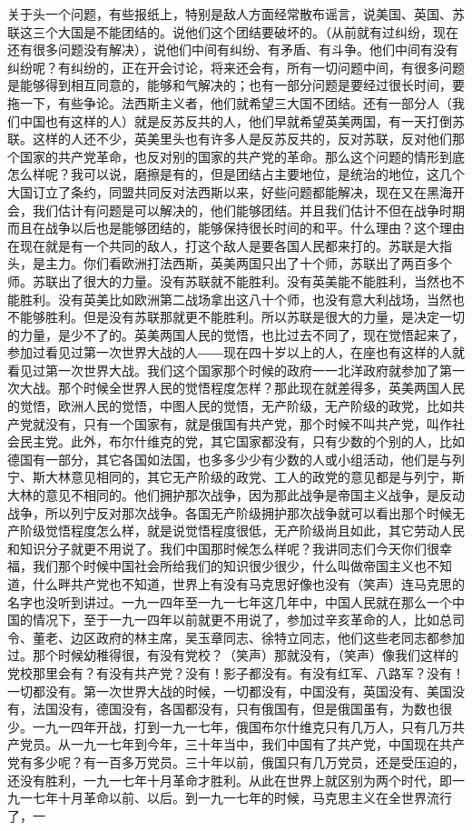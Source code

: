 关于头一个问题，有些报纸上，特别是敌人方面经常散布谣言，说美国、英国、苏联这三个大国是不能团结的。说他们这个团结要破坏的。（从前就有过纠纷，现在还有很多问题没有解决），说他们中间有纠纷、有矛盾、有斗争。他们中间有没有纠纷呢？有纠纷的，正在开会讨论，将来还会有，所有一切问题中间，有很多问题是能够得到相互同意的，能够和气解决的；也有一部分问题是要经过很长时间，要拖一下，有些争论。法西斯主义者，他们就希望三大国不团结。还有一部分人（我们中国也有这样的人）就是反苏反共的人，他们早就希望英美两国，有一天打倒苏联。这样的人还不少，英美里头也有许多人是反苏反共的，反对苏联，反对他们那个国家的共产党革命，也反对别的国家的共产党的革命。那么这个问题的情形到底怎么样呢？我可以说，磨擦是有的，但是团结占主要地位，是统治的地位，这几个大国订立了条约，同盟共同反对法西斯以来，好些问题都能解决，现在又在黑海开会，我们估计有问题是可以解决的，他们能够团结。并且我们估计不但在战争时期而且在战争以后也是能够团结的，能够保持很长时间的和平。什么理由？这个理由在现在就是有一个共同的敌人，打这个敌人是要各国人民都来打的。苏联是大指头，是主力。你们看欧洲打法西斯，英美两国只出了十个师，苏联出了两百多个师。苏联出了很大的力量。没有苏联就不能胜利。没有英美能不能胜利，当然也不能胜利。没有英美比如欧洲第二战场拿出这八十个师，也没有意大利战场，当然也不能够胜利。但是没有苏联那就更不能胜利。所以苏联是很大的力量，是决定一切的力量，是少不了的。英美两国人民的觉悟，也比过去不同了，现在觉悟起来了，参加过看见过第一次世界大战的人――现在四十岁以上的人，在座也有这样的人就看见过第一次世界大战。我们这个国家那个时候的政府一一北洋政府就参加了第一次大战。那个时候全世界人民的觉悟程度怎样？那此现在就差得多，英美两国人民的觉悟，欧洲人民的觉悟，中图人民的觉悟，无产阶级，无产阶级的政党，比如共产党就没有，只有一个国家有，就是俄国有共产党，那个时候不叫共产党，叫作社会民主党。此外，布尔什维克的党，其它国家都没有，只有少数的个别的人，比如德国有一部分，其它各国如法国，也多多少少有少数的人或小组活动，他们是与列宁、斯大林意见相同的，其它无产阶级的政党、工人的政党的意见都是与列宁，斯大林的意见不相同的。他们拥护那次战争，因为那此战争是帝国主义战争，是反动战争，所以列宁反对那次战争。各国无产阶级拥护那次战争就可以看出那个时候无产阶级觉悟程度怎么样，就是说觉悟程度很低，无产阶级尚且如此，其它劳动人民和知识分子就更不用说了。我们中国那时候怎么样呢？我讲同志们今天你们很幸福，我们那个时候中国社会所给我们的知识很少很少，什么叫做帝国主义也不知道，什么畔共产党也不知道，世界上有没有马克思好像也没有（笑声）连马克思的名字也没听到讲过。一九一四年至一九一七年这几年中，中国人民就在那么一个中国的情况下，至于一九一四年以前就更不用说了，参加过辛亥革命的人，比如总司令、董老、边区政府的林主席，吴玉章同志、徐特立同志，他们这些老同志都参加过。那个时候幼稚得很，有没有党校？（笑声）那就没有，（笑声）像我们这样的党校那里会有？有没有共产党？没有！影子都没有。有没有红军、八路军？没有！一切都没有。第一次世界大战的时候，一切都没有，中国没有，英国没有、美国没有，法国没有，德国没有，各国都没有，只有俄国有，但是俄国虽有，为数也很少。一九一四年开战，打到一九一七年，俄国布尔什维克只有几万人，只有几万共产党员。从一九一七年到今年，三十年当中，我们中国有了共产党，中国现在共产党有多少呢？有一百多万党员。三十年以前，俄国只有几万党员，还是受压迫的，还没有胜利，一九一七年十月革命才胜利。从此在世界上就区别为两个时代，即一九一七年十月革命以前、以后。到一九一七年的时候，马克思主义在全世界流行了，一